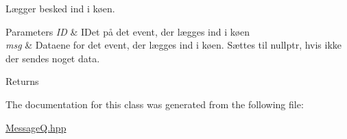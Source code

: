 Lægger besked ind i køen. 


\begin{DoxyParams}{Parameters}
{\em ID} & ID\textquotesingle{}et på det event, der lægges ind i køen \\
\hline
{\em msg} & Dataene for det event, der lægges ind i køen. Sættes til nullptr, hvis ikke der sendes noget data. \\
\hline
\end{DoxyParams}
\begin{DoxyReturn}{Returns}

\end{DoxyReturn}


The documentation for this class was generated from the following file\+:\begin{DoxyCompactItemize}
\item 
\hyperlink{MessageQ_8hpp}{Message\+Q.\+hpp}\end{DoxyCompactItemize}
